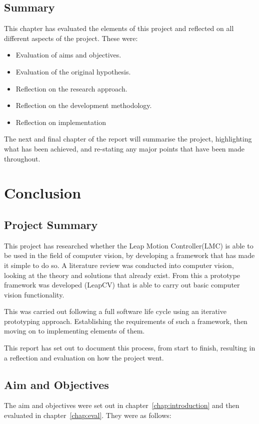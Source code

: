 \documentclass[11pt,oneside]{report}
\begin{document}
	\section{Summary}
	This chapter has evaluated the elements of this project and reflected on all different aspects of the project.
	These were:
	\begin{itemize}
		\item Evaluation of aims and objectives.
		\item Evaluation of the original hypothesis.
		\item Reflection on the research approach.
		\item Reflection on the development methodology.
		\item Reflection on implementation
	\end{itemize}
	The next and final chapter of the report will summarise the project, highlighting what has been achieved, and re-stating any major points that have been made throughout. 
	
	\chapter{Conclusion}\label{chap:concl}
	
	\section{Project Summary}
	This project has researched whether the Leap Motion Controller(LMC) is able to be used in the field of computer vision, by developing a framework that has made it simple to do so.
	A literature review was conducted into computer vision, looking at the theory and solutions that already exist.
	From this a prototype framework was developed (LeapCV) that is able to carry out basic computer vision functionality.
	
	This was carried out following a full software life cycle using an iterative prototyping approach.
	Establishing the requirements of such a framework, then moving on to implementing elements of them.
	
	This report has set out to document this process, from start to finish, resulting in a reflection and evaluation on how the project went.
	
	\section{Aim and Objectives}
	The aim and objectives were set out in chapter~\ref{chap:introduction} and then evaluated in chapter~\ref{chap:eval}.
	They were as follows:
\end{document}
